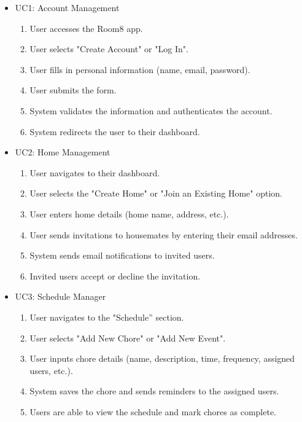 \documentclass{scrreprt}
\theoremstyle{definition}
\begin{document}
\begin{itemize}
    \item UC1: Account Management
    \begin{enumerate}
        \item User accesses the Room8 app.
        \item User selects "Create Account" or "Log In".
        \item User fills in personal information (name, email, password).
        \item User submits the form.
        \item System validates the information and authenticates the account.
        \item System redirects the user to their dashboard.
    \end{enumerate}  
    
    \item UC2: Home Management
    \begin{enumerate}
        \item User navigates to their dashboard.
        \item User selects the "Create Home" or "Join an Existing Home" option.
        \item User enters home details (home name, address, etc.).
        \item User sends invitations to housemates by entering their email addresses.
        \item System sends email notifications to invited users.
        \item Invited users accept or decline the invitation.
    \end{enumerate}
    
    \item UC3: Schedule Manager
    \begin{enumerate}
        \item User navigates to the "Schedule” section.
        \item User selects "Add New Chore" or "Add New Event".
        \item User inputs chore details (name, description, time, frequency, assigned users, etc.).
        \item System saves the chore and sends reminders to the assigned users.
        \item Users are able to view the schedule and mark chores as complete.
    \end{enumerate}
    

\end{itemize}
\end{document}
